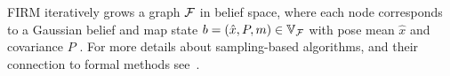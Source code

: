 \documentclass[letterpaper]{article} %
\begin{document}
FIRM iteratively grows a graph $\mathcal{F}$ in belief space, where each node corresponds to a Gaussian belief and map state $b = (\hat{x},P, m) \in \mathbb{V}_{\mathcal{F}}$ with pose mean $\hat{x}$ and covariance $P$ \cite{Ali14-IJRR}. For more details about sampling-based algorithms, and their connection to formal methods see~\cite{Lav06,KF-IJRR11}\cite{VaBe-IROS-2013}. %





\end{document}
